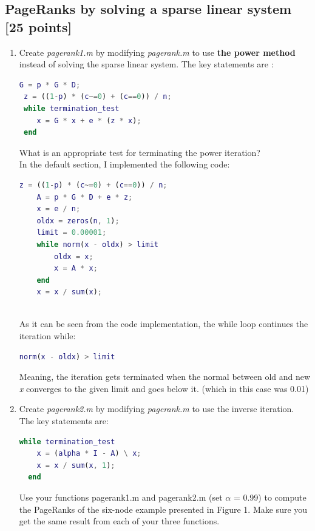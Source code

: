 \documentclass[unicode,11pt,a4paper,oneside,numbers=endperiod,openany]{scrartcl}
\begin{document}
\subsection{PageRanks by solving a sparse linear system [25 points]}
\begin{enumerate}
 \item Create \textit{pagerank1.m} by modifying \textit{pagerank.m} to use \textbf{the power method} instead of solving the sparse linear system. The key statements are : \\
 \begin{lstlisting}[language=Matlab]
 G = p * G * D;
 z = ((1-p) * (c~=0) + (c==0)) / n;
 while termination_test
    x = G * x + e * (z * x);
 end
 \end{lstlisting}
 What is an appropriate test for terminating the power iteration?\\
 
 In the default section, I implemented the following code:
 \begin{lstlisting}[language=Matlab]
    z = ((1-p) * (c~=0) + (c==0)) / n;
    A = p * G * D + e * z; 
    x = e / n;
    oldx = zeros(n, 1);
    limit = 0.00001;
    while norm(x - oldx) > limit
        oldx = x;
        x = A * x;
    end
    x = x / sum(x);
  
 \end{lstlisting}
 
 As it can be seen from the code implementation, the while loop continues the iteration while:
 \begin{lstlisting}[language=Matlab]
  norm(x - oldx) > limit
 \end{lstlisting}
 
 Meaning, the iteration gets terminated when the normal between old and new \textit{x} converges to the given limit and goes below it. (which in this case was 0.01)
 
 \item Create \textit{pagerank2.m} by modifying \textit{pagerank.m} to use the inverse iteration. The key statements are:
 \begin{lstlisting}[language=Matlab]
  while termination_test
    x = (alpha * I - A) \ x;
    x = x / sum(x, 1);
  end
 \end{lstlisting}
 
 Use your functions pagerank1.m and pagerank2.m (set $\alpha$ = 0.99) to compute the PageRanks of the six-node example presented in Figure 1. Make sure you get the same result from each of your three functions.\\
 

\end{enumerate}
\end{document}
